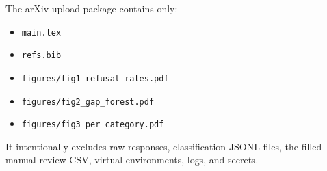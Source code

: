 \documentclass[11pt]{article}
\begin{document}
The arXiv upload package contains only:
\begin{itemize}[leftmargin=1.5em,itemsep=2pt,topsep=2pt]
  \item \texttt{main.tex}
  \item \texttt{refs.bib}
  \item \texttt{figures/fig1\_refusal\_rates.pdf}
  \item \texttt{figures/fig2\_gap\_forest.pdf}
  \item \texttt{figures/fig3\_per\_category.pdf}
\end{itemize}

It intentionally excludes raw responses, classification JSONL files, the filled manual-review CSV, virtual environments, logs, and secrets.
\end{document}

